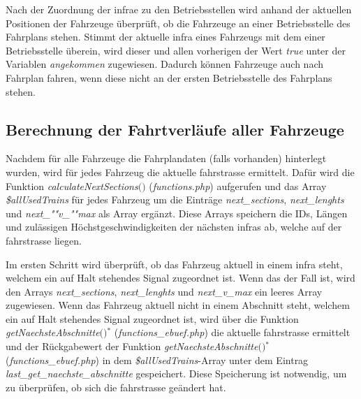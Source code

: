 Nach der Zuordnung der \ac{infra}e zu den Betriebsstellen wird anhand der aktuellen Positionen der Fahrzeuge überprüft, ob die Fahrzeuge an einer Betriebsstelle des Fahrplans stehen. Stimmt der aktuelle \ac{infra} eines Fahrzeugs mit dem einer Betriebsstelle überein, wird dieser und allen vorherigen der Wert \textit{true} unter der Variablen \textit{angekommen} zugewiesen. Dadurch können Fahrzeuge auch nach Fahrplan fahren, wenn diese nicht an der ersten Betriebsstelle des Fahrplans stehen. 
\subsection{Berechnung der Fahrtverläufe aller Fahrzeuge} \label{main_3}
Nachdem für alle Fahrzeuge die Fahrplandaten (falls vorhanden) hinterlegt wurden, wird für jedes Fahrzeug die aktuelle  \Gls{fahrstrasse} ermittelt. Dafür wird die Funktion \textit{calculateNextSections$($$)$} (\textit{functions.php}) aufgerufen und das Array \textit{\$allUsedTrains} für jedes Fahrzeug um die Einträge \textit{next\_sections}, \textit{next\_lenghts} und \textit{next\_""v\_""max} als Array ergänzt. Diese Arrays speichern die IDs, Längen und zulässigen Höchstgeschwindigkeiten der nächsten \acp{infra} ab, welche auf der \Gls{fahrstrasse} liegen. 

Im ersten Schritt wird überprüft, ob das Fahrzeug aktuell in einem \ac{infra} steht, welchem ein auf Halt stehendes Signal zugeordnet ist. Wenn das der Fall ist, wird den Arrays \textit{next\_sections}, \textit{next\_lenghts} und \textit{next\_v\_max} ein leeres Array zugewiesen. Wenn das Fahrzeug aktuell nicht in einem Abschnitt steht, welchem ein auf Halt stehendes Signal zugeordnet ist, wird über die Funktion \textit{getNaechsteAbschnitte$($$)$}$^\ast$ (\textit{functions\_ebuef.php}) die aktuelle \Gls{fahrstrasse} ermittelt und der Rückgabewert der Funktion \textit{getNaechsteAbschnitte$($$)$}$^\ast$ (\textit{functions\_ebuef.php}) in dem \textit{\$allUsedTrains}-Array unter dem Eintrag \textit{last\_get\_naechste\_abschnitte} gespeichert. Diese Speicherung ist notwendig, um zu überprüfen, ob sich die \Gls{fahrstrasse} geändert hat. 

